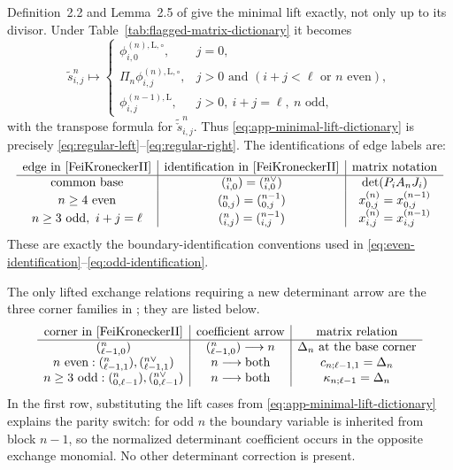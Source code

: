 \documentclass[11pt]{amsart}
\theoremstyle{definition}
\theoremstyle{remark}
\begin{document}
Definition~2.2 and Lemma~2.5 of \cite{FeiKroneckerII} give the minimal
lift exactly, not only up to its divisor.  Under Table~\ref{tab:flagged-matrix-dictionary} it becomes
\begin{equation}
 \widetilde s_{i,j}^{n}\longmapsto
 \begin{cases}
  \phi_{i,0}^{(n),\mathrm L,\circ},&j=0,\\[1mm]
  \Pi_n\phi_{i,j}^{(n),\mathrm L,\circ},
    &j>0\text{ and }(i+j<\ell\text{ or }n\text{ even}),\\[1mm]
  \phi_{i,j}^{(n-1),\mathrm L},
    &j>0,\ i+j=\ell,\ n\text{ odd},
 \end{cases}
 \label{eq:app-minimal-lift-dictionary}
\end{equation}
with the transpose formula for $\widetilde{\check s}_{i,j}^{n}$.  Thus
\eqref{eq:app-minimal-lift-dictionary} is precisely
\eqref{eq:regular-left}--\eqref{eq:regular-right}.  The identifications of
edge labels are:
\begin{equation}
\begin{array}{c|c|c}
 \text{edge in \cite{FeiKroneckerII}}&\text{identification in \cite{FeiKroneckerII}}&\text{matrix notation}\\ \hline
 \text{common base}&({}_{i,0}^{n})=({}_{i,0}^{n\vee})
    &\det(P_iA_nJ_i)\\
 n\ge4\text{ even}&({}_{0,j}^{n})=({}_{0,j}^{n-1})
    &x_{0,j}^{(n)}=x_{0,j}^{(n-1)}\\
 n\ge3\text{ odd},\ i+j=\ell
    &({}_{i,j}^{n})=({}_{i,j}^{n-1})
    &x_{i,j}^{(n)}=x_{i,j}^{(n-1)}
\end{array}
\label{eq:app-edge-identification-table}
\end{equation}
These are exactly the boundary-identification conventions used in
\eqref{eq:even-identification}--\eqref{eq:odd-identification}.

The only lifted exchange relations requiring a new determinant arrow are
the three corner families in \cite[Corollaries~5.3--5.4]{FeiKroneckerII};
they are listed below.
\begin{equation}
\begin{array}{c|c|c}
 \text{corner in \cite{FeiKroneckerII}}&\text{coefficient arrow}&\text{matrix relation}\\ \hline
 ({}_{\ell-1,0}^{n})&({}_{\ell-1,0}^{n})\longrightarrow n
   &\Delta_n\text{ at the base corner}\\
 n\text{ even}:({}_{\ell-1,1}^{n}),({}_{\ell-1,1}^{n\vee})
   &n\longrightarrow\text{both}
   &c_{n;\ell-1,1}=\Delta_n\\
 n\ge3\text{ odd}:({}_{0,\ell-1}^{n}),({}_{0,\ell-1}^{n\vee})
   &n\longrightarrow\text{both}
   &\kappa_{n;\ell-1}=\Delta_n
\end{array}
\label{eq:app-corner-correction-table}
\end{equation}
In the first row, substituting
the lift cases from \eqref{eq:app-minimal-lift-dictionary} explains the
parity switch: for odd $n$ the boundary variable is inherited from
block $n-1$, so the normalized determinant coefficient occurs in the
opposite exchange monomial.  No other determinant correction is present.
\end{document}
